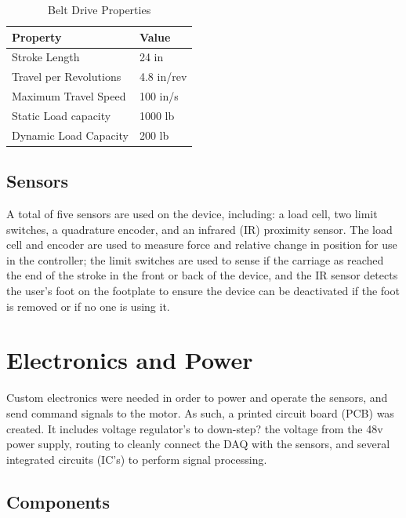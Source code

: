 \documentclass[12pt]{report}
\begin{document}
	\begin{table}[]
	\centering
	\caption{Belt Drive Properties}	
	\begin{tabular}{|l|l|}
		\hline
		\textbf{Property} & \textbf{Value}  \\ \hline
		Stroke Length & 24 in  \\ \hline
 		Travel per Revolutions & 4.8 in/rev  \\ \hline
 		Maximum Travel Speed & 100 in/s  \\ \hline
 		Static Load capacity & 1000 lb  \\ \hline
 		Dynamic Load Capacity & 200 lb  \\ \hline
		\end{tabular}
	\label{tab:belt}
	\end{table}
	
	 
		
		\subsection{Sensors}

	A total of five sensors are used on the device, including: a load cell, two limit switches, a quadrature encoder, and an infrared (IR) proximity sensor. The load cell and encoder are used to measure force and relative change in position for use in the controller; the limit switches are used to sense if the carriage as reached the end of the stroke in the front or back of the device, and the IR sensor detects the user's foot on the footplate to ensure the device can be deactivated if the foot is removed or if no one is using it. 		
		
	\section{Electronics and Power}
	
	Custom electronics were needed in order to power and operate the sensors, and send command signals to the motor. As such, a printed circuit board (PCB) was created. It includes voltage regulator's to down-step? the voltage from the 48v power supply, routing to cleanly connect the DAQ with the sensors, and several integrated circuits (IC's) to perform signal processing. 
	
	
	
		\subsection{Components}
		
\end{document}
